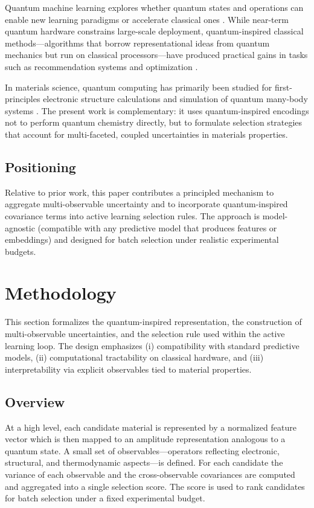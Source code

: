 \documentclass{article}
\begin{document}
Quantum machine learning explores whether quantum states and operations can enable new learning paradigms or accelerate classical ones \cite{biamonte2017quantum, schuld2015introduction}. While near-term quantum hardware constrains large-scale deployment, quantum-inspired classical methods—algorithms that borrow representational ideas from quantum mechanics but run on classical processors—have produced practical gains in tasks such as recommendation systems and optimization \cite{tang2019quantum, abbas2021power}.

In materials science, quantum computing has primarily been studied for first-principles electronic structure calculations and simulation of quantum many-body systems \cite{mcardle2020quantum, cao2019quantum}. The present work is complementary: it uses quantum-inspired encodings not to perform quantum chemistry directly, but to formulate selection strategies that account for multi-faceted, coupled uncertainties in materials properties.

\subsection{Positioning}

Relative to prior work, this paper contributes a principled mechanism to aggregate multi-observable uncertainty and to incorporate quantum-inspired covariance terms into active learning selection rules. The approach is model-agnostic (compatible with any predictive model that produces features or embeddings) and designed for batch selection under realistic experimental budgets.

\section{Methodology}
\label{sec:method}

This section formalizes the quantum-inspired representation, the construction of multi-observable uncertainties, and the selection rule used within the active learning loop. The design emphasizes (i) compatibility with standard predictive models, (ii) computational tractability on classical hardware, and (iii) interpretability via explicit observables tied to material properties.

\subsection{Overview}

At a high level, each candidate material is represented by a normalized feature vector which is then mapped to an amplitude representation analogous to a quantum state. A small set of observables—operators reflecting electronic, structural, and thermodynamic aspects—is defined. For each candidate the variance of each observable and the cross-observable covariances are computed and aggregated into a single selection score. The score is used to rank candidates for batch selection under a fixed experimental budget.
\end{document}
